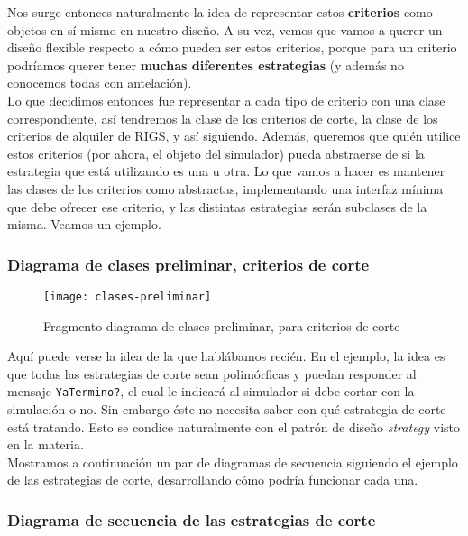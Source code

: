 Nos surge entonces naturalmente la idea de representar estos \textbf{criterios} 
como objetos en sí mismo en nuestro diseño. A su vez, vemos que vamos a querer 
un diseño flexible respecto a cómo pueden ser estos criterios, porque para un 
criterio podríamos querer tener \textbf{muchas diferentes estrategias} (y además 
no conocemos todas con antelación). \\

Lo que decidimos entonces fue representar a cada tipo de criterio con una clase 
correspondiente, así tendremos la clase de los criterios de corte, la clase de 
los criterios de alquiler de RIGS, y así siguiendo. Además, queremos que quién 
utilice estos criterios (por ahora, el objeto del simulador) pueda abstraerse de 
si la estrategia que está utilizando es una u otra. Lo que vamos a hacer es 
mantener las clases de los criterios como abstractas, implementando una interfaz 
mínima que debe ofrecer ese criterio, y las distintas estrategias serán 
subclases de la misma. Veamos un ejemplo. 

\subsubsection{Diagrama de clases preliminar, criterios de corte}

\begin{figure}[H]
\centering
\caption{Fragmento diagrama de clases preliminar, para criterios de corte}
\texttt{[image: clases-preliminar]}
\end{figure}

Aquí puede verse la idea de la que hablábamos recién. En el ejemplo, la idea
es que todas las estrategias de corte sean polimórficas y puedan responder al 
mensaje \texttt{YaTermino?}, el cual le indicará al simulador si debe cortar 
con la simulación o no. Sin embargo éste no necesita saber con qué estrategia 
de corte está tratando. Esto se condice naturalmente con el patrón de diseño 
\textit{strategy} visto en la materia. \\

Mostramos a continuación un par de diagramas de secuencia siguiendo el ejemplo 
de las estrategias de corte, desarrollando cómo podría funcionar cada una. 

\subsubsection{Diagrama de secuencia de las estrategias de corte}

